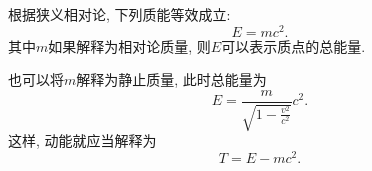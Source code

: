 \documentclass{ctexart}
\begin{document}
根据狭义相对论, 下列质能等效成立:
\[ E = mc^2. \]
其中$m$如果解释为相对论质量, 则$E$可以表示质点的总能量.
\par
也可以将$m$解释为静止质量, 此时总能量为
\[ E = \frac{m}{\sqrt{1 - \frac{v^2}{c^2}}}c^2. \]
这样, 动能就应当解释为
\[ T = E - mc^2. \]
\end{document}
